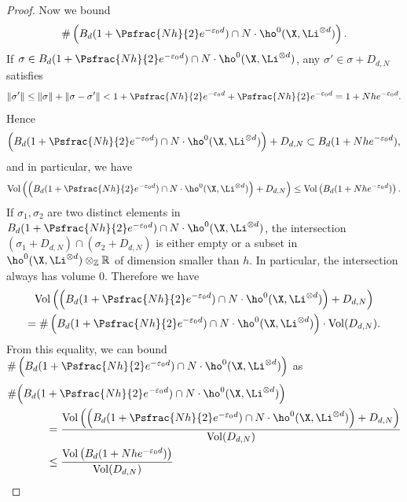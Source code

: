 \begin{proof}[Proof]
Now we bound
\[
\#\left(B_d(1+\Psfrac{Nh}{2}e^{-\varepsilon_0 d}) \cap N\cdot \ho^0(\X,\Li^{\otimes d}) \right).
\]
If $\sigma\in B_d(1+\Psfrac{Nh}{2}e^{-\varepsilon_0 d}) \cap N\cdot \ho^0(\X,\Li^{\otimes d})$, any $\sigma'\in \sigma+D_{d,N}$ satisfies
\[
\lVert \sigma' \rVert \leq \lVert \sigma\rVert +\lVert \sigma-\sigma'\rVert <1+\Psfrac{Nh}{2}e^{-\varepsilon_0 d}+\Psfrac{Nh}{2}e^{-\varepsilon_0 d}=1+Nhe^{-\varepsilon_0 d}.
\]
Hence
\[
\left(B_d(1+\Psfrac{Nh}{2}e^{-\varepsilon_0 d}) \cap N\cdot \ho^0(\X,\Li^{\otimes d}) \right)+D_{d,N}\subset B_d(1+Nhe^{-\varepsilon_0 d}),
\]
and in particular, we have
\[
\mathrm{Vol}\left(\left(B_d(1+\Psfrac{Nh}{2}e^{-\varepsilon_0 d}) \cap N\cdot \ho^0(\X,\Li^{\otimes d}) \right)+D_{d,N} \right)\leq \mathrm{Vol} \left(B_d(1+Nhe^{-\varepsilon_0 d}) \right).
\]
If $\sigma_1,\sigma_2$ are two distinct elements in $B_d(1+\Psfrac{Nh}{2}e^{-\varepsilon_0 d}) \cap N\cdot \ho^0(\X,\Li^{\otimes d})$, the intersection $(\sigma_1+D_{d,N})\cap (\sigma_2+D_{d,N})$ is either empty or a subset in $\ho^0(\X,\Li^{\otimes d})\otimes_{\mathbb{Z}}\mathbb{R}$ of dimension smaller than $h$. In particular, the intersection always has volume $0$. Therefore we have
\begin{multline*}
\mathrm{Vol}\left(\left(B_d(1+\Psfrac{Nh}{2}e^{-\varepsilon_0 d}) \cap N\cdot \ho^0(\X,\Li^{\otimes d}) \right)+D_{d,N} \right) \\
=\# \left(B_d(1+\Psfrac{Nh}{2}e^{-\varepsilon_0 d}) \cap N\cdot \ho^0(\X,\Li^{\otimes d}) \right)\cdot \mathrm{Vol}(D_{d,N}).
\end{multline*}
From this equality, we can bound $\# \left(B_d(1+\Psfrac{Nh}{2}e^{-\varepsilon_0 d}) \cap N\cdot \ho^0(\X,\Li^{\otimes d}) \right)$ as
\begin{align*}
\# \Bigl(B_d(1&+\Psfrac{Nh}{2}e^{-\varepsilon_0 d}) \cap N\cdot \ho^0(\X,\Li^{\otimes d}) \Bigr)\\
&=\frac{\mathrm{Vol}\left(\left(B_d(1+\Psfrac{Nh}{2}e^{-\varepsilon_0 d}) \cap N\cdot \ho^0(\X,\Li^{\otimes d}) \right)+D_{d,N} \right)}{\mathrm{Vol}(D_{d,N})}\\
&\leq \frac{\mathrm{Vol} \left(B_d(1+Nhe^{-\varepsilon_0 d}) \right)}{\mathrm{Vol}(D_{d,N})}
\end{align*}


\end{proof}
